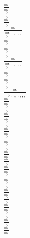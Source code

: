 \documentclass[11pt]{article}
\begin{document}
\begin{center}
\bigskip
\\$\frac{\Rightarrow }{\Rightarrow }$
\bigskip
\\$\frac{\Rightarrow }{\Rightarrow }$
\bigskip
\\$\frac{\Rightarrow }{\Rightarrow }$
\bigskip
\\$\frac{\Rightarrow }{\Rightarrow , , , , , }$
\bigskip
\\$\frac{\Rightarrow }{\Rightarrow }$
\bigskip
\\$\frac{\Rightarrow }{\Rightarrow }$
\bigskip
\\$\frac{\Rightarrow }{\Rightarrow }$
\bigskip
\\$\frac{\Rightarrow }{\Rightarrow , , , , , }$
\bigskip
\\$\frac{\Rightarrow }{\Rightarrow }$
\bigskip
\\$\frac{\Rightarrow }{\Rightarrow }$
\bigskip
\\$\frac{\Rightarrow }{\Rightarrow }$
\bigskip
\\$\frac{\Rightarrow }{\Rightarrow , , , , , , , }$
\bigskip
\\$\frac{\Rightarrow }{\Rightarrow }$
\bigskip
\\$\frac{\Rightarrow }{\Rightarrow }$
\bigskip
\\$\frac{\Rightarrow }{\Rightarrow }$
\bigskip
\\$\frac{\Rightarrow }{\Rightarrow }$
\bigskip
\\$\frac{\Rightarrow }{\Rightarrow }$
\bigskip
\\$\frac{\Rightarrow }{\Rightarrow }$
\bigskip
\\$\frac{\Rightarrow }{\Rightarrow }$
\bigskip
\\$\frac{\Rightarrow }{\Rightarrow }$
\bigskip
\\$\frac{\Rightarrow }{\Rightarrow }$
\bigskip
\\$\frac{\Rightarrow }{\Rightarrow }$
\bigskip
\\$\frac{\Rightarrow }{\Rightarrow }$
\bigskip
\\$\frac{\Rightarrow }{\Rightarrow }$
\bigskip
\\$\frac{\Rightarrow }{\Rightarrow }$
\bigskip
\\$\frac{\Rightarrow }{\Rightarrow }$
\bigskip
\\$\frac{\Rightarrow }{\Rightarrow }$
\bigskip
\\$\frac{\Rightarrow }{\Rightarrow }$
\bigskip
\\$\frac{\Rightarrow }{\Rightarrow }$
\bigskip
\\$\frac{\Rightarrow }{\Rightarrow }$

\end{center}
\end{document}
